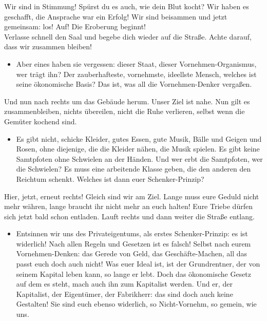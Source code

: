 \documentclass[a4paper, 12pt]{report}
\begin{document}
Wir sind in Stimmung! 
Spürst du es auch, wie dein Blut kocht?
Wir haben es geschafft, die Ansprache war ein Erfolg! 
Wir sind beisammen und jetzt gemeinsam: los! Auf! Die Eroberung beginnt!\\
Verlasse schnell den Saal und begebe dich wieder auf die Straße. 
Achte darauf, dass wir zusammen bleiben!

\begin{itemize}\em
\item[] Aber eines haben sie vergessen:
    dieser Staat, dieser Vornehmen-Organismus, wer trägt ihn? 
    Der zauberhafteste, vornehmste, ideellste Mensch, welches ist seine ökonomische Basis?
    Das ist, was all die Vornehmen-Denker vergaßen. 
\end{itemize}

Und nun nach rechts um das Gebäude herum. 
Unser Ziel ist nahe. 
Nun gilt es zusammenbleiben, nichts übereilen, nicht die Ruhe verlieren, selbst wenn die Gemüter kochend sind.

\begin{itemize}\em
\item[] Es gibt nicht, schicke Kleider, gutes Essen, gute Musik, Bälle und Geigen und Rosen, ohne diejenige, die die Kleider nähen, die Musik spielen.
    Es gibt keine Samtpfoten ohne Schwielen an der Händen.
    Und wer erbt die Samtpfoten, wer die Schwielen?
    Es muss eine arbeitende Klasse geben, die den anderen den Reichtum schenkt.
    Welches ist dann euer Schenker-Prinzip?
\end{itemize}

Hier, jetzt, erneut rechts! 
Gleich sind wir am Ziel. 
Lange muss eure Geduld nicht mehr währen, lange braucht ihr nicht mehr an euch halten!
Eure Triebe dürfen sich jetzt bald schon entladen. 
Lauft rechts und dann weiter die Straße entlang.

\begin{itemize}\em
\item[] Entsinnen wir uns des Privateigentums, als erstes Schenker-Prinzip: 
    es ist widerlich! 
    Nach allen Regeln und Gesetzen ist es falsch! 
    Selbst nach eurem Vornehmen-Denken: das Gerede von Geld, das Geschäfte-Machen, all das passt euch doch auch nicht!
    Was euer Ideal ist, ist der Grundrentner, der von seinem Kapital leben kann, so lange er lebt. 
    Doch das ökonomische Gesetz auf dem es steht, mach auch ihn zum Kapitalist werden.
    Und er, der Kapitalist, der Eigentümer, der Fabrikherr: das sind doch auch keine Gestalten!
    Sie sind euch ebenso widerlich, so Nicht-Vornehm, so gemein, wie uns.
\end{itemize}
\end{document}
